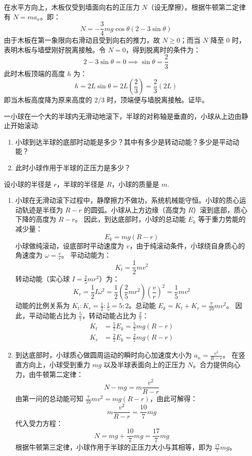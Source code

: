 \begin{solution}
在水平方向上，木板仅受到墙面向右的正压力 $N$（设无摩擦）。根据牛顿第二定律有 $N = m a_x$。即：
$$ N = -\frac{3}{4} m g \cos\theta (2 - 3\sin\theta) $$
由于木板在第一象限向右滑动且受到向右的推力，故 $N \ge 0$；而当 $N$ 降至 $0$ 时，表明木板与墙壁刚好脱离接触。令 $N = 0$，得到脱离时的条件为：
$$ 2 - 3\sin\theta = 0 \implies \sin\theta = \frac{2}{3} $$
此时木板顶端的高度 $h$ 为：
$$ h = 2L \sin\theta = 2L \left(\frac{2}{3}\right) = \frac{2}{3} (2L) $$
即当木板高度降为原来高度的 $2/3$ 时，顶端便与墙脱离接触。证毕。
\end{solution}

\begin{exercise}\label{ex:6.6}
一小球在一个大的半球内无滑动地滚下，半球的对称轴是垂直的，小球从上边由静止开始滚动. 
\begin{enumerate}
  \item[(a)] 小球到达半球的底部时动能是多少？其中有多少是转动动能？多少是平动动能？
  \item[(b)] 此时小球作用于半球的正压力是多少？
\end{enumerate}
设小球的半径是 $r$，半球的半径是 $R$，小球的质量是 $m$.
\end{exercise}
\begin{solution}
\begin{enumerate}
    \item[(a)] 小球在无滑动滚下过程中，静摩擦力不做功，系统机械能守恒。小球的质心运动轨迹是半径为 $R-r$ 的圆弧。小球从上方边缘（高度为 $R$）滚到底部，质心下降的高度为 $R - r$。
    因此，到达底部时，小球的总动能 $E_k$ 等于重力势能的减少量：
    $$ E_k = m g (R - r) $$
    小球做纯滚动，设底部时平动速度为 $v$，由于纯滚动条件，小球绕自身质心的角速度为 $\omega = \frac{v}{r}$。
    平动动能为：
    $$ K_t = \frac{1}{2} m v^2 $$
    转动动能（实心球 $I = \frac{2}{5} m r^2$）为：
    $$ K_r = \frac{1}{2} I \omega^2 = \frac{1}{2} \left( \frac{2}{5} m r^2 \right) \left( \frac{v}{r} \right)^2 = \frac{1}{5} m v^2 $$
    动能的比例关系为 $K_t : K_r = \frac{1}{2} : \frac{1}{5} = 5 : 2$。总动能 $E_k = K_t + K_r = \frac{7}{10} m v^2$。
    因此，平动动能占比为 $\frac{5}{7}$，转动动能占比为 $\frac{2}{7}$：
    \begin{align*}
        K_t &= \frac{5}{7} E_k = \frac{5}{7} m g (R - r) \\
        K_r &= \frac{2}{7} E_k = \frac{2}{7} m g (R - r)
    \end{align*}

    \item[(b)] 到达底部时，小球质心做圆周运动的瞬时向心加速度大小为 $a_n = \frac{v^2}{R - r}$。
    在竖直方向上，小球受到重力 $mg$ 以及半球表面向上的正压力 $N$。合力提供向心力，由牛顿第二定律：
    $$ N - mg = m \frac{v^2}{R - r} $$
    由第一问的总动能可知 $\frac{7}{10} m v^2 = mg(R-r)$，由此可解得：
    $$ m \frac{v^2}{R - r} = \frac{10}{7} mg $$
    代入受力方程：
    $$ N = mg + \frac{10}{7} mg = \frac{17}{7} mg $$
    根据牛顿第三定律，小球作用于半球的正压力大小与其相等，即为 $\frac{17}{7} mg$。
\end{enumerate}
\end{solution}


